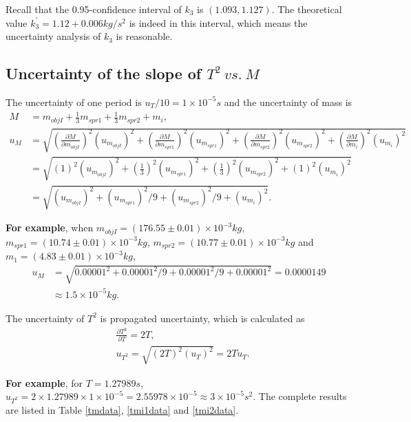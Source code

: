     Recall that the 0.95-confidence interval of $k_3$ is $(1.093,1.127)$. The theoretical value $k_3^{'}=1.12+0.006 kg/s^2$ is indeed in this interval, which means the uncertainty analysis of $k_3$ is reasonable.\\
    
\subsection{Uncertainty of the slope of $T^2\ vs.\ M$}
    The uncertainty of one period is $u_T/10=1\times10^{-5}s$ and the uncertainty of mass is
    \[
    \begin{split}
        M&=m_{objI}+\frac{1}{3}m_{spr1}+\frac{1}{3}m_{spr2}+m_i,\\
        u_M&=\sqrt{
         (\frac{\partial M}{\partial m_{objI}})^2(u_{m_{objI}})^2
        +(\frac{\partial M}{\partial m_{spr1}})^2(u_{m_{spr1}})^2
        +(\frac{\partial M}{\partial m_{spr2}})^2(u_{m_{spr2}})^2
        +(\frac{\partial M}{\partial m_i})^2(u_{m_i})^2
        }\\
        &=\sqrt{
         (1)^2(u_{m_{objI}})^2
        +(\frac{1}{3})^2(u_{m_{spr1}})^2
        +(\frac{1}{3})^2(u_{m_{spr2}})^2
        +(1)^2(u_{m_i})^2
        }\\
        &=\sqrt{(u_{m_{objI}})^2+(u_{m_{spr1}})^2/9+(u_{m_{spr2}})^2/9+(u_{m_i})^2}.
    \end{split}
    \]

    \textbf{For example}, when $m_{objI}=(176.55\pm0.01)\times10^{-3}kg$, $m_{spr1}=(10.74\pm0.01)\times10^{-3}kg$, $m_{spr2}=(10.77\pm0.01)\times10^{-3}kg$ and $m_1=(4.83\pm0.01)\times10^{-3}kg$,
    \[
    \begin{split}
        u_M&=\sqrt{0.00001^2+0.00001^2/9+0.00001^2/9+0.00001^2}=0.0000149\\
        &\approx 1.5\times10^{-5}kg.
    \end{split}
    \]

    The uncertainty of $T^2$ is propagated uncertainty, which is calculated as
    \[
    \begin{split}
        &\frac{\partial T^2}{\partial T}=2T,\\
        &u_{T^2}=\sqrt{(2T)^2(u_T)^2}=2Tu_T.
    \end{split}
    \]

    \textbf{For example}, for $T=1.27989s$, $u_{T^2}=2\times1.27989\times1\times10^{-5}=2.55978\times10^{-5}\approx3\times10^{-5}s^2$. The complete results are listed in Table \ref{tmdata}, \ref{tmi1data} and \ref{tmi2data}.

